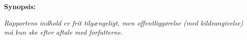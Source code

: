 \hfill
\begin{minipage}[t]{0.483\textwidth}
\textbf{Synopsis:} \\[5pt]
\fbox{\parbox{7.5cm}{\bigskip\bigskip}}
\end{minipage}

\vfill

{\footnotesize\itshape Rapportens indhold er frit tilgængeligt, men offentliggørelse (med kildeangivelse) må kun ske efter aftale med forfatterne.}

